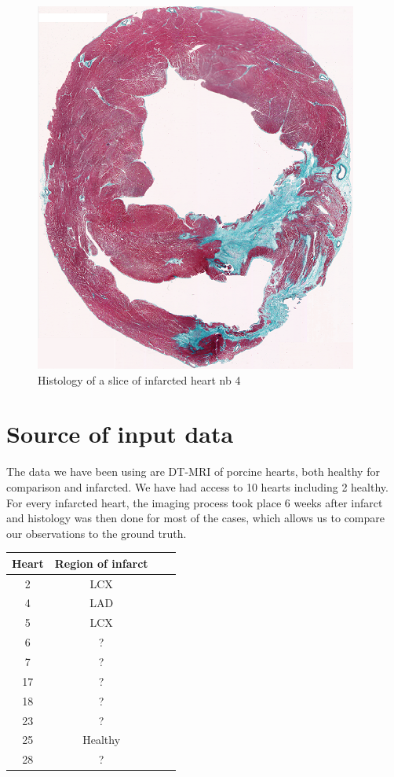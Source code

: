 \begin{figure}[h!]
    \centering
    \includegraphics[width=\textwidth]{figures/histology_pig_4}
    \caption{Histology of a slice of infarcted heart nb 4}
    \label{fig:histology_pig_4}
\end{figure}

\section{Source of input data}

The data we have been using are DT-MRI of porcine hearts, both healthy for comparison and infarcted. We have had access to 10 hearts including 2 healthy. For every infarcted heart, the imaging process took place 6 weeks after infarct and histology was then done for most of the cases, which allows us to compare our observations to the ground truth.

\begin{center}
 \begin{tabular}{|c | c | c | c|} 
 \hline
 Heart & Region of infarct \\
 \hline
 2 & LCX \\ 
 \hline
 4 & LAD \\
 \hline
 5 & LCX \\
 \hline
 6 & ? \\
 \hline
 7 & ? \\ 
 \hline
 17 & ? \\
 \hline
 18 & ? \\
 \hline
 23 & ? \\
 \hline
 25 & Healthy \\
 \hline
 28 & ? \\
 \hline
\end{tabular}
\end{center}

